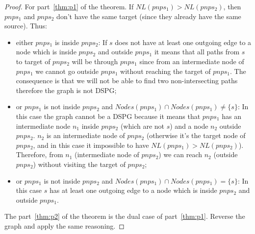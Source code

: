 \begin{proof}
\label{prf:anlsys1}
For part~\ref{thm:p1} of the theorem.
If $NL(pnps_1) > NL(pnps_2)$, then $pnps_1$ and $pnps_2$ don't have the same target (since they already have the same source). Thus:
\begin{itemize}
    \item  either $pnps_1$ is inside $pnps_2$: If $s$ does not have at least one outgoing edge to a node which is inside $pnps_2$ and outside $pnps_1$ it means that all paths from $s$ to target of $pnps_2$ will be through $pnps_1$ since from an intermediate node of $pnps_1$ we cannot go outside $pnps_1$ without reaching the target of $pnps_1$. The consequence is that we will not be able to find two non-intersecting paths therefore the graph is not \ac{DSPG};
    
    \item or $pnps_1$ is not inside $pnps_2$ and $Nodes(pnps_1) \cap Nodes(pnps_1) \neq \{s\}$: In this case the graph cannot be a \ac{DSPG} because it means that $pnps_1$ has an intermediate node $n_1$ inside $pnps_2$ (which are not $s$) and a node $n_2$  outside $pnps_2$. $n_2$ is an intermediate node of $pnps_2$ (otherwise it’s the target node of $pnps_2$, and in this case it impossible to have $NL(pnps_1)>NL(pnps_2 )$). Therefore, from $n_1$ (intermediate node of $pnps_2$) we can reach $n_2$ (outside $pnps_2$)  without visiting the target of $pnps_2$;
    
    \item or $pnps_1$ is not inside $pnps_2$ and $Nodes(pnps_1) \cap Nodes(pnps_1) = \{s\}$: In this case $s$ has at least one outgoing edge to a node which is inside $pnps_2$ and outside $pnps_1$.
\end{itemize}

The part~\ref{thm:p2} of the theorem is the dual case of part~\ref{thm:p1}. Reverse the graph and apply the same reasoning.
\end{proof}


